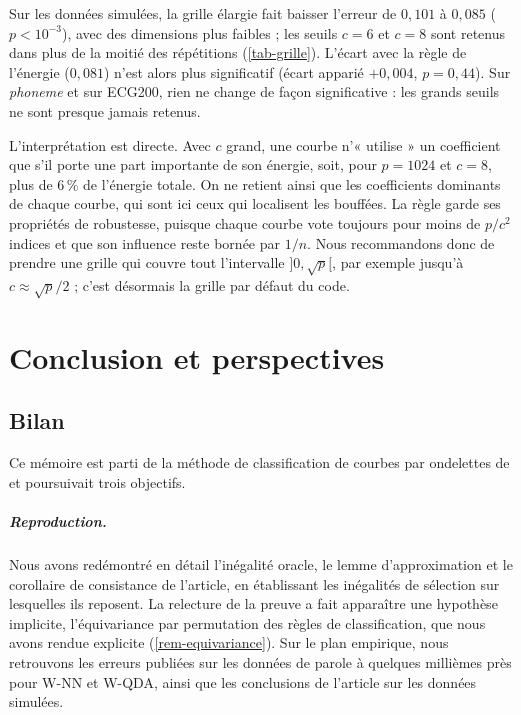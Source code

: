 Sur les données simulées, la grille élargie fait baisser l'erreur de $0{,}101$ à $0{,}085$ ($p<10^{-3}$), avec des dimensions plus faibles ; les seuils $c=6$ et $c=8$ sont retenus dans plus de la moitié des répétitions (\cref{tab-grille}). L'écart avec la règle de l'énergie ($0{,}081$) n'est alors plus significatif (écart apparié $+0{,}004$, $p=0{,}44$). Sur \emph{phoneme} et sur ECG200, rien ne change de façon significative : les grands seuils ne sont presque jamais retenus.

L'interprétation est directe. Avec $c$ grand, une courbe n'« utilise » un coefficient que s'il porte une part importante de son énergie, soit, pour $p=1024$ et $c=8$, plus de $6\,\%$ de l'énergie totale. On ne retient ainsi que les coefficients dominants de chaque courbe, qui sont ici ceux qui localisent les bouffées. La règle garde ses propriétés de robustesse, puisque chaque courbe vote toujours pour moins de $p/c^2$ indices et que son influence reste bornée par $1/n$. Nous recommandons donc de prendre une grille qui couvre tout l'intervalle $]0,\sqrt p[$, par exemple jusqu'à $c\approx\sqrt p/2$ ; c'est désormais la grille par défaut du code.

\chapter{Conclusion et perspectives}\label{chap-conclusion}

\section{Bilan}

Ce mémoire est parti de la méthode de classification de courbes par ondelettes de \citet{berlinet2008functional} et poursuivait trois objectifs.

\paragraph{Reproduction.} Nous avons redémontré en détail l'inégalité oracle, le lemme d'approximation et le corollaire de consistance de l'article, en établissant les inégalités de sélection sur lesquelles ils reposent. La relecture de la preuve a fait apparaître une hypothèse implicite, l'équivariance par permutation des règles de classification, que nous avons rendue explicite (\cref{rem-equivariance}). Sur le plan empirique, nous retrouvons les erreurs publiées sur les données de parole à quelques millièmes près pour W-NN et W-QDA, ainsi que les conclusions de l'article sur les données simulées.

